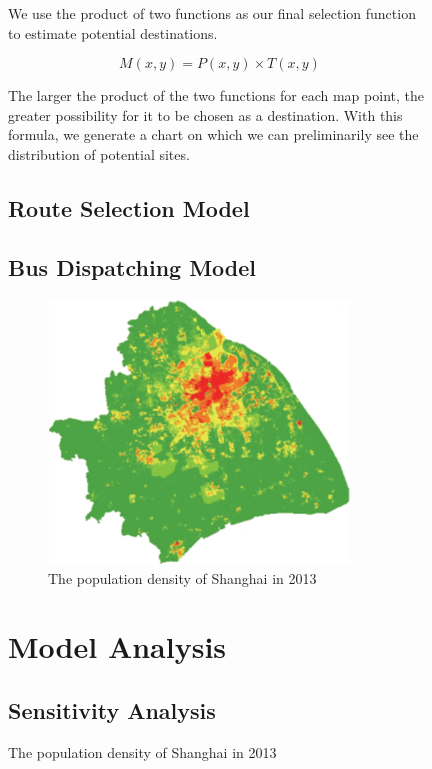 \documentclass{mcmthesis}
\begin{document}
\begin{figure}[htbp]
\centering    %
 


We use the product of two functions as our final selection function to estimate potential destinations.

\begin{equation}\label{1steq}
    M(x,y) = P(x,y) \times T(x,y)
\end{equation}

The larger the product of the two functions for each map point, the greater possibility for it to be chosen as a destination. With this formula, we generate a chart on which we can preliminarily see the distribution of potential sites.

\subsection{Route Selection Model}
\subsection{Bus Dispatching Model}




\begin{figure}[htbp]
    \centering
    \includegraphics[height=7cm,width=8cm]{figures/pd.jpg}
    \caption{The population density of Shanghai in 2013~\cite{dqxxkx_ppl}}
    \label{fig:population density}
\end{figure}






\section{Model Analysis}
\subsection{Sensitivity Analysis}

\end{figure}
\end{document}
